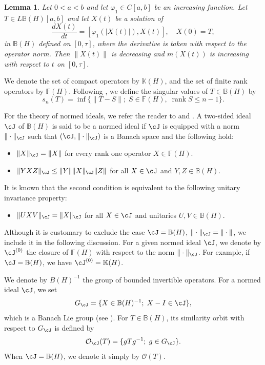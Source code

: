 \documentclass[12pt]{article}
\newtheorem{lemma}[theorem]{Lemma}
\theoremstyle{definition}
\numberwithin{equation}{section}
\newcommand{\B}{\mathbb{B}}
\newcommand{\F}{\mathbb{F}}
\newcommand{\K}{\mathbb{K}}
\newcommand{\cO}{\mathcal{O}} \newcommand{\cP}{\mathcal{P}}
\begin{document}
\begin{lemma}\label{decreasing3}
Let $0<a<b$ and let $\varphi_1\in C[a,b]$ be an increasing function. 
Let $T\in L\B(H)[a,b]$ and let $X(t)$ be a solution of 
\begin{equation}\label{LODE}
\frac{dX(t)}{dt}=[\varphi_1(|X(t)|),X(t)],\quad X(0)=T,
\end{equation} 
in $\B(H)$ defined on $[0,\tau]$, where the derivative is taken with respect to the operator norm. 
Then $\|X(t)\|$ is decreasing and $m(X(t))$ is increasing with respect to $t$ on $[0,\tau]$. 
\end{lemma}

 

We denote the set of compact operators by $\K(H)$, and the set of finite rank operators by $\F(H)$.  
Following \cite[Eq.(2.7)]{GK1969}, we define the singular values of $T\in \B(H)$ by 
\[s_n(T)=\inf\{\|T-S\|;\; S\in \F(H),\; \operatorname{rank} S\leq n-1\}.\]

For the theory of normed ideals, we refer the reader to \cite{GK1969} and \cite{S2005}. 
A two-sided ideal $\cJ$ of $\B(H)$ is said to be a normed ideal if $\cJ$ is equipped with a norm 
$\|\cdot\|_\cJ$ such that $(\cJ, \|\cdot \|_\cJ)$ is a Banach space and the following hold: 
\begin{itemize}
	\item [(1)] $\|X\|_\cJ=\|X\|$ for every rank one operator $X\in \F(H)$.
	\item [(2)] $\|YXZ\|_\cJ\leq \|Y\| \|X\|_\cJ \|Z\|$ for all $X\in \cJ$ and $Y,Z\in \B(H)$. 
\end{itemize}
It is known that the second condition is equivalent to the following unitary invariance property: 
\begin{itemize}
	\item [(2)'] $\|UXV\|_\cJ= \|X\|_\cJ$ for all $X\in \cJ$ and unitaries $U,V\in \B(H)$. 
\end{itemize}
Although it is customary to exclude the case $\cJ=\B(H)$, $\|\cdot\|_\cJ=\|\cdot\|$, we include it in the following discussion. 
For a given normed ideal $\cJ$, we denote by $\cJ^{(0)}$ the closure of $\F(H)$ with respect to the norm $\|\cdot\|_\cJ$. 
For example, if $\cJ=\B(H)$, we have $\cJ^{(0)}=\K(H)$. 


We denote by $B(H)^{-1}$ the group of bounded invertible operators. 
For a normed ideal $\cJ$, we set
\[G_\cJ=\{X\in \B(H)^{-1};\; X-I\in \cJ\},\]
which is a Banach Lie group (see \cite{de la Harpe1972}). 
For $T\in \B(H)$, its similarity orbit with respect to $G_\cJ$ is defined by 
\[\cO_\cJ(T)=\{gTg^{-1};\; g\in G_\cJ\}.\]
When $\cJ=\B(H)$, we denote it simply by $\cO(T)$.   
\end{document}
